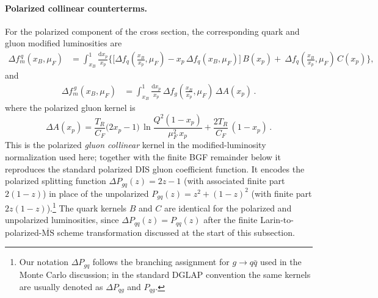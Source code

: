 \documentclass[a4paper,11pt]{article}
\begin{document}
\paragraph{Polarized collinear counterterms.}
For the polarized component of the cross section, the corresponding quark and gluon modified luminosities are
\begin{align}
\Delta f^{\,q}_m(x_B,\mu_F)
&=\int_{x_B}^{1}\frac{\mathrm{d}x_p}{x_p}\Bigg\{
\Big[\Delta f_q\!\left(\frac{x_B}{x_p},\mu_F\right)-x_p\,\Delta f_q(x_B,\mu_F)\Big]\,B(x_p)
+\ \Delta f_q\!\left(\frac{x_B}{x_p},\mu_F\right)\,C(x_p)
\Bigg\},
\label{eq:Dfm-pol}
\end{align}
and
\begin{align}
\Delta f^{\,g}_m(x_B,\mu_F)
&=\int_{x_B}^{1}\frac{\mathrm{d}x_p}{x_p}\,
\Delta f_g\!\left(\frac{x_B}{x_p},\mu_F\right)\,\Delta A(x_p)\,.
\label{eq:Dfmg-pol}
\end{align}
where the polarized gluon kernel is
\begin{equation}
\Delta A(x_p)=\frac{T_R}{C_F}\big(2x_p-1\big)\,
\ln\!\frac{Q^2(1-x_p)}{\mu_F^2\,x_p}
+\frac{2T_R}{C_F}\,(1-x_p)\,.
\label{eq:DA-kernel}
\end{equation}
This is the polarized \emph{gluon collinear} kernel in the modified-luminosity normalization used here; together with the finite BGF remainder below it reproduces the standard polarized DIS gluon coefficient function. It encodes the polarized splitting function $\Delta P_{gq}(z) = 2z - 1$ (with associated finite part $2(1{-}z)$) in place of the unpolarized $P_{gq}(z)=z^2+(1{-}z)^2$ (with finite part $2z(1{-}z)$).\footnote{Our notation $\Delta P_{gq}$ follows the branching assignment for $g\to q\bar q$ used in the Monte Carlo discussion; in the standard DGLAP convention the same kernels are usually denoted as $\Delta P_{qg}$ and $P_{qg}$.} The quark kernels $B$ and $C$ are identical for the polarized and unpolarized luminosities, since $\Delta P_{qq}(z) = P_{qq}(z)$ after the finite Larin-to-polarized-$\overline{\text{MS}}$ scheme transformation discussed at the start of this subsection.
\end{document}
